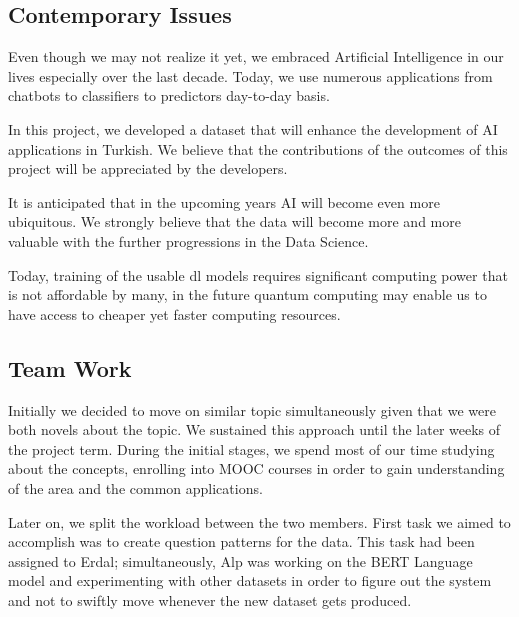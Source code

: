 \documentclass{mefsdp}
\begin{document}
	
	\subsection{Contemporary Issues}
	
	Even though we may not realize it yet, we embraced Artificial Intelligence in our lives especially over the last decade. Today, we use numerous applications from chatbots to classifiers to predictors day-to-day basis. \newline \par
	
	In this project, we developed a dataset that will enhance the development of AI applications in Turkish. We believe that the contributions of the outcomes of this project will be appreciated by the developers. \newline \par
	
	It is anticipated that in the upcoming years AI will become even more ubiquitous. We strongly believe that the data will become more and more valuable with the further progressions in the Data Science. \newline \par
	
	Today, training of the usable \gls{dl} models requires significant computing power that is not affordable by many, in the future quantum computing may enable us to have access to cheaper yet faster computing resources. \newline \par
	
	\subsection{Team Work}
	Initially we decided to move on similar topic simultaneously given that we were both novels about the topic. We sustained this approach until the later weeks of the project term. During the initial stages, we spend most of our time studying about the concepts, enrolling into MOOC courses in order to gain understanding of the area and the common applications. \newline \par
	
	Later on, we split the workload between the two members. First task we aimed to accomplish was to create question patterns for the data. This task had been assigned to Erdal; simultaneously, Alp was working on the BERT Language model and experimenting with other datasets in order to figure out the system and not to swiftly move whenever the new dataset gets produced. \newline \par
	
\end{document}
